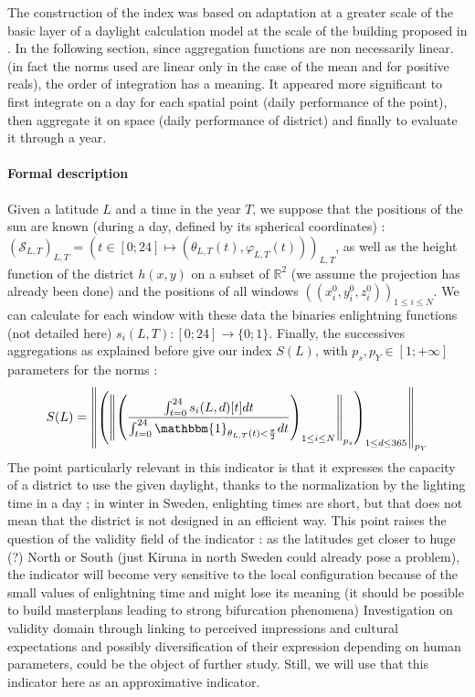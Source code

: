 \documentclass[english]{article}
\begin{document}
\bigskip{}


The construction of the index was based on adaptation at a greater
scale of the basic layer of a daylight calculation model at the
scale of the building proposed in \cite{miguet2002daylight}. In the
following section, since aggregation functions are non necessarily linear.
(in fact the norms used are linear only in the case of the mean and
for positive reals), the order of integration has a meaning. It
appeared more significant to first integrate on a day for each spatial
point (daily performance of the point), then aggregate it on space
(daily performance of district) and finally to evaluate it through
a year.

\bigskip{}



\paragraph{Formal description}

Given a latitude $L$ and a time in the year $T$, we suppose that
the positions of the sun are known (during a day, defined by its spherical coordinates)
: $(\mathcal{S}_{L,T})_{L,T}=(t\in[0;24]\mapsto(\theta_{L,T}(t),\varphi_{L,T}(t)))_{L,T}$, 
as well as the height function of the district $h(x,y)$ on a subset of $\mathbb{R}^{2}$
(we assume the projection has already been done) and the positions
of all windows $((x_{i}^{0},y_{i}^{0},z_{i}^{0}))_{1\leq i\leq N}$.
We can calculate for each window with these data the binaries enlightning
functions (not detailed here) $s_{i}(L,T):[0;24]\rightarrow\{0;1\}$.
Finally, the successives aggregations as explained before give our
index $S(L)$, with $p_{s},p_{Y}\in[1;+\infty]$ parameters for the
norms : \[S(L)=\left\Vert \left(\left\Vert \left(\frac{\intop_{t=0}^{24}s_{i}(L,d)[t]dt}{\intop_{t=0}^{24}\mathbbm{1}_{\theta_{L,T}(t)<\frac{\pi}{2}}dt}\right)_{1\leq i\leq N}\right\Vert _{p_{s}}\right)_{1\leq d\leq365}\right\Vert _{p_{Y}} \]The
point particularly relevant in this indicator is that it expresses
the capacity of a district to use the given daylight, thanks to the
normalization by the lighting time in a day ; in winter in Sweden,
enlighting times are short, but that does not mean that the district
is not designed in an efficient way. This point raises the question
of the validity field of the indicator : as the latitudes get closer to huge (?)
North or South (just Kiruna in north Sweden could already pose a problem),
the indicator will become very sensitive to the local configuration because of the small
values of enlightning time and might lose its meaning (it should
be possible to build masterplans leading to strong bifurcation phenomena)
Investigation on validity domain through linking to perceived impressions
and cultural expectations and possibly diversification of their expression
depending on human parameters, could be the object of further study.
Still, we will use that this indicator here as an approximative indicator.
\end{document}
